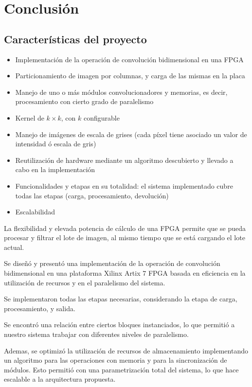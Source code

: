 \chapter{Conclusión}  \label{conclusion_sec}

\section{Características del proyecto}
\begin{itemize}
\item Implementación de la operación de convolución bidimensional en una FPGA
\item Particionamiento de imagen por columnas, y carga de las mismas en la placa
\item Manejo de uno o más módulos convolucionadores y memorias, es decir, procesamiento con cierto grado de paralelismo
\item Kernel de $ k \times k$, con $k$ configurable
\item Manejo de imágenes de escala de grises (cada píxel tiene asociado un valor de intensidad ó escala de gris)
\item Reutilización de hardware mediante un algoritmo descubierto y llevado a cabo en la implementación
\item Funcionalidades y etapas en su totalidad: el sistema implementado cubre todas las etapas (carga, procesamiento, devolución)
\item Escalabilidad
\end{itemize}
    
La flexibilidad y elevada potencia de cálculo de una FPGA permite que se pueda
procesar y filtrar el lote de imagen, al mismo tiempo que se está cargando el lote
actual.

Se diseñó y presentó una implementación de la operación de convolución
bidimensional en una plataforma Xilinx Artix 7 FPGA basada en eficiencia en la
utilización de recursos y en el paralelismo del sistema.

Se implementaron todas las etapas necesarias, considerando la etapa de carga,
procesamiento, y salida.

Se encontró una relación entre ciertos bloques
instanciados, lo que permitió a nuestro sistema trabajar con diferentes niveles
de paralelismo.

Ademas, se optimizó la utilización de recursos de almacenamiento implementando
un algoritmo para las operaciones con memoria y para la sincronización de
módulos. Esto permitió con una parametrización total del sistema, lo que hace
escalable a la arquitectura propuesta.

